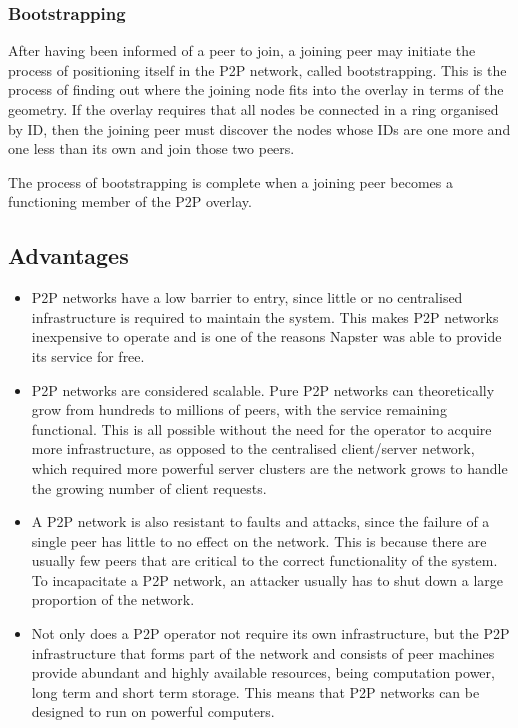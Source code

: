 \subsubsection{Bootstrapping}

After having been informed of a peer to join, a joining peer may initiate the process of positioning itself in the P2P network, called bootstrapping. This is the process of finding out where the joining node fits into the overlay in terms of the geometry. If the overlay requires that all nodes be connected in a ring organised by ID, then the joining peer must discover the nodes whose IDs are one more and one less than its own and join those two peers.

The process of bootstrapping is complete when a joining peer becomes a functioning member of the P2P overlay.


\subsection{Advantages}

\begin{itemize}
\item P2P networks have a low barrier to entry, since little or no centralised infrastructure is required to maintain the system. This makes P2P networks inexpensive to operate and is one of the reasons Napster was able to provide its service for free.

\item P2P networks are considered scalable. Pure P2P networks can theoretically grow from hundreds to millions of peers, with the service remaining functional. This is all possible without the need for the operator to acquire more infrastructure, as opposed to the centralised client/server network, which required more powerful server clusters are the network grows to handle the growing number of client requests.

\item A P2P network is also resistant to faults and attacks, since the failure of a single peer has little to no effect on the network. This is because there are usually few peers that are critical to the correct functionality of the system. To incapacitate a P2P network, an attacker usually has to shut down a large proportion of the network.

\item Not only does a P2P operator not require its own infrastructure, but the P2P infrastructure that forms part of the network and consists of peer machines provide abundant and highly available resources, being computation power, long term and short term storage. This means that P2P networks can be designed to run on powerful computers.
\end{itemize}


